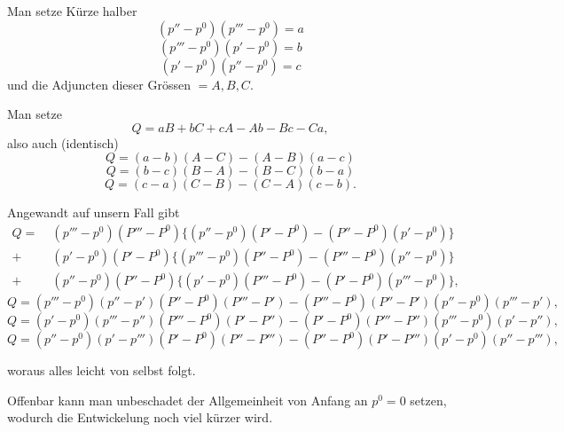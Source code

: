 
Man setze Kürze halber
\[
(p''-p^0)(p'''-p^0) = a
\]
\[
(p'''-p^0)(p'-p^0) = b
\]
\[
(p'-p^0)(p''-p^0) = c
\]
und die Adjuncten dieser Grössen $= A, B, C$.

Man setze
\begin{equation}
Q = aB+bC+cA-Ab-Bc-Ca,
\tag*{1)}
\end{equation}
also auch (identisch)
\begin{equation}
Q = (a-b)(A-C)-(A-B)(a-c)
\tag*{2)}
\end{equation}
\begin{equation}
Q = (b-c)(B-A)-(B-C)(b-a)
\tag*{3)}
\end{equation}
\begin{equation}
Q = (c-a)(C-B)-(C-A)(c-b).
\tag*{4)}
\end{equation}

Angewandt auf unsern Fall gibt
\begin{equation}
\begin{aligned}
Q = \;& (p'''-p^0)(P'''-P^0)\{(p''-p^0)(P'-P^0)-(P''-P^0)(p'-p^0)\}\\
+\;& (p'-p^0)(P'-P^0)\{(p'''-p^0)(P''-P^0)-(P'''-P^0)(p''-p^0)\}\\
+\;& (p''-p^0)(P''-P^0)\{(p'-p^0)(P'''-P^0)-(P'-P^0)(p'''-p^0)\},
\end{aligned}
\tag{1}
\end{equation}
\begin{equation}
Q=(p'''-p^0)(p''-p')(P''-P^0)(P'''-P') - (P'''-P^0)(P''-P')(p''-p^0)(p'''-p'),
\tag{2}
\end{equation}
\begin{equation}
Q=(p'-p^0)(p'''-p'')(P'''-P^0)(P'-P'') - (P'-P^0)(P'''-P'')(p'''-p^0)(p'-p''),
\tag{3}
\end{equation}
\begin{equation}
Q=(p''-p^0)(p'-p''')(P'-P^0)(P''-P''') - (P''-P^0)(P'-P''')(p'-p^0)(p''-p'''),
\tag{4}
\end{equation}

woraus alles leicht von selbst folgt.

Offenbar kann man unbeschadet der Allgemeinheit von Anfang an $p^0=0$ setzen, wodurch die Entwickelung noch viel kürzer wird.
